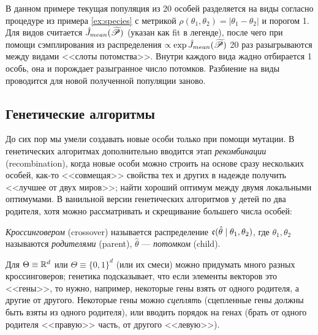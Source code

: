\begin{example}
В данном примере текущая популяция из 20 особей разделяется на виды согласно процедуре из примера \ref{ex:species} с метрикой $\rho(\theta_1, \theta_2) = |\theta_1 - \theta_2|$ и порогом 1. Для видов считается $\hat{J}_{\mathop{mean}}(\widetilde{\mathscr{P}})$ (указан как fit в легенде), после чего при помощи сэмплирования из распределения $\propto \exp \hat{J}_{\mathop{mean}}(\widetilde{\mathscr{P}})$ 20 раз разыгрываются между видами <<слоты потомства>>. Внутри каждого вида жадно отбирается 1 особь, она и порождает разыгранное число потомков. Разбиение на виды проводится для новой полученной популяции заново.
\begin{center}
\end{center}
\end{example}

\subsection{Генетические алгоритмы}

До сих пор мы умели создавать новые особи только при помощи мутации. В генетических алгоритмах дополнительно вводится этап \emph{рекомбинации} (recombination), когда новые особи можно строить на основе сразу нескольких особей, как-то <<совмещая>> свойства тех и других в надежде получить <<лучшее от двух миров>>; найти хороший оптимум между двумя локальными оптимумами. В ванильной версии генетических алгоритмов у детей по два родителя, хотя можно рассматривать и скрещивание большего числа особей:

\newcommand{\cross}{\mathfrak{c}}
\begin{definition}
\emph{Кроссинговером} (crossover) называется распределение $\cross(\hat{\theta} \HM\mid \theta_1, \theta_2)$, где $\theta_1, \theta_2$ называются \emph{родителями} (parent), $\hat{\theta}$ --- \emph{потомком} (child).
\end{definition}

\begin{example}
Для $\Theta \equiv \mathbb{R}^d$ или $\Theta \equiv \{0, 1\}^d$ (или их смеси) можно придумать много разных кроссинговеров; генетика подсказывает, что если элементы векторов это <<гены>>, то нужно, например, некоторые гены взять от одного родителя, а другие от другого. Некоторые гены можно \emph{сцеплять} (сцепленные гены должны быть взяты из одного родителя), или вводить порядок на генах (брать от одного родителя <<правую>> часть, от другого <<левую>>).
\end{example}

